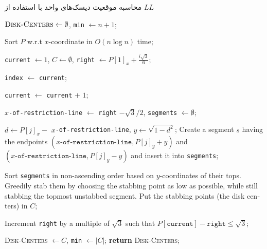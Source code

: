 \documentclass[12pt]{article}
\begin{document}
\begin{algorithm}[H]
\singlespacing
\caption{
محاسبه موقعیت دیسک‌های واحد با استفاده از $LL$
} 
\label{alg:LL} 
\begin{latin}
\begin{algorithmic}[1] 
    \STATE $\textsc{Disk-Centers} \leftarrow \emptyset$, \texttt{min} $\leftarrow n+1$;
   
    \STATE Sort $P$ w.r.t $x$-coordinate in $O(n\log n)$ time;

 \STATE \texttt{current} $\leftarrow 1$, $C \leftarrow \emptyset$, \texttt{right} $\leftarrow P[1]_x + \frac{i\sqrt{3}}{6}$;

     \STATE \texttt{index} $\leftarrow$ \texttt{current};
     
         \STATE \texttt{current} $\leftarrow$ \texttt{current} $+$ $1$;
     \ENDWHILE
     
     \STATE \texttt{$x$-of-restriction-line} $\leftarrow$ \texttt{right} $-\sqrt{3}/2$, \texttt{segments} $\leftarrow \emptyset$;
     
         \STATE $d\leftarrow P[j]_x-$ \texttt{$x$-of-restriction-line}, $y\leftarrow \sqrt{1-d^2}$;
         \STATE Create a segment $s$ having the endpoints $(x\texttt{-of-restriction-line}, P[j]_y+y)$ and $(x\texttt{-of-restriction-line}, P[j]_y-y)$ and insert it into \texttt{segments};
     \ENDFOR
     
     \STATE Sort \texttt{segments} in non-ascending order based on $y$-coordinates of their tops. Greedily stab them by choosing the stabbing point as low as possible, while still stabbing the topmost unstabbed segment. Put the stabbing points (the disk centers) in $C$;
     
     \STATE Increment \texttt{right} by a multiple of $\sqrt{3}$ such that $P[\texttt{current}] - \texttt{right} \leq \sqrt{3}$;

 \ENDWHILE
 
   
         \STATE \textsc{Disk-Centers} $\leftarrow C$, \texttt{min} $\leftarrow |C|$;
     \ENDIF
\ENDFOR
\STATE \textbf{return} \textsc{Disk-Centers};
\end{algorithmic}
\end{latin}
\end{algorithm}
\end{document}
